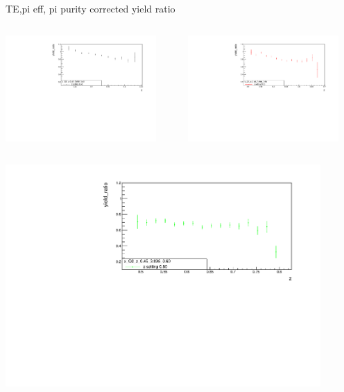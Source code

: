 \begin{frame}{TE,pi eff, pi purity corrected yield ratio}
\begin{columns}
\begin{column}[T]{0.5\textwidth}
\includegraphics[width = 0.9\textwidth]{results/yield/statistics_corr/x_Q2_z_0.45_3.898_0.40_ratio.pdf}
\end{column}
\begin{column}[T]{0.5\textwidth}
\includegraphics[width = 0.9\textwidth]{results/yield/statistics_corr/x_Q2_z_0.45_3.898_0.50_ratio.pdf}
\end{column}
\end{columns}
\begin{columns}
\begin{column}[T]{0.5\textwidth}
\includegraphics[width = 0.9\textwidth]{results/yield/statistics_corr/x_Q2_z_0.45_3.898_0.60_ratio.pdf}

\end{column}
\end{columns}
\end{frame}
